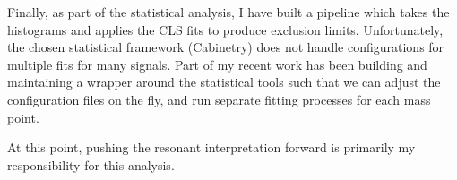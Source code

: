 \documentclass[12pt]{article}
\begin{document}
Finally, as part of the statistical analysis, I have built a pipeline which
takes the histograms and applies the CLS fits to produce exclusion limits.
Unfortunately, the chosen statistical framework (Cabinetry) \cite{cabinetry}
does not handle configurations for multiple fits for many signals. Part of my
recent work has been building and maintaining a wrapper around the statistical
tools such that we can adjust the configuration files on the fly, and run
separate fitting processes for each mass point.

At this point, pushing the resonant interpretation forward is primarily my
responsibility for this analysis.

\end{document}
